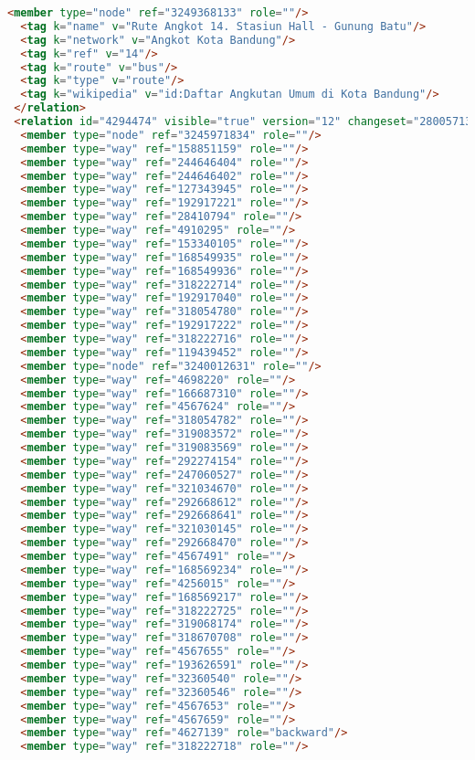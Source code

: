 \begin{lstlisting}[language=HTML,basicstyle=\tiny,caption=test.xml]
  <member type="node" ref="3249368133" role=""/>
  <tag k="name" v="Rute Angkot 14. Stasiun Hall - Gunung Batu"/>
  <tag k="network" v="Angkot Kota Bandung"/>
  <tag k="ref" v="14"/>
  <tag k="route" v="bus"/>
  <tag k="type" v="route"/>
  <tag k="wikipedia" v="id:Daftar Angkutan Umum di Kota Bandung"/>
 </relation>
 <relation id="4294474" visible="true" version="12" changeset="28005713" timestamp="2015-01-08T20:32:47Z" user="isonpurba" uid="2552445">
  <member type="node" ref="3245971834" role=""/>
  <member type="way" ref="158851159" role=""/>
  <member type="way" ref="244646404" role=""/>
  <member type="way" ref="244646402" role=""/>
  <member type="way" ref="127343945" role=""/>
  <member type="way" ref="192917221" role=""/>
  <member type="way" ref="28410794" role=""/>
  <member type="way" ref="4910295" role=""/>
  <member type="way" ref="153340105" role=""/>
  <member type="way" ref="168549935" role=""/>
  <member type="way" ref="168549936" role=""/>
  <member type="way" ref="318222714" role=""/>
  <member type="way" ref="192917040" role=""/>
  <member type="way" ref="318054780" role=""/>
  <member type="way" ref="192917222" role=""/>
  <member type="way" ref="318222716" role=""/>
  <member type="way" ref="119439452" role=""/>
  <member type="node" ref="3240012631" role=""/>
  <member type="way" ref="4698220" role=""/>
  <member type="way" ref="166687310" role=""/>
  <member type="way" ref="4567624" role=""/>
  <member type="way" ref="318054782" role=""/>
  <member type="way" ref="319083572" role=""/>
  <member type="way" ref="319083569" role=""/>
  <member type="way" ref="292274154" role=""/>
  <member type="way" ref="247060527" role=""/>
  <member type="way" ref="321034670" role=""/>
  <member type="way" ref="292668612" role=""/>
  <member type="way" ref="292668641" role=""/>
  <member type="way" ref="321030145" role=""/>
  <member type="way" ref="292668470" role=""/>
  <member type="way" ref="4567491" role=""/>
  <member type="way" ref="168569234" role=""/>
  <member type="way" ref="4256015" role=""/>
  <member type="way" ref="168569217" role=""/>
  <member type="way" ref="318222725" role=""/>
  <member type="way" ref="319068174" role=""/>
  <member type="way" ref="318670708" role=""/>
  <member type="way" ref="4567655" role=""/>
  <member type="way" ref="193626591" role=""/>
  <member type="way" ref="32360540" role=""/>
  <member type="way" ref="32360546" role=""/>
  <member type="way" ref="4567653" role=""/>
  <member type="way" ref="4567659" role=""/>
  <member type="way" ref="4627139" role="backward"/>
  <member type="way" ref="318222718" role=""/>

\end{lstlisting}

